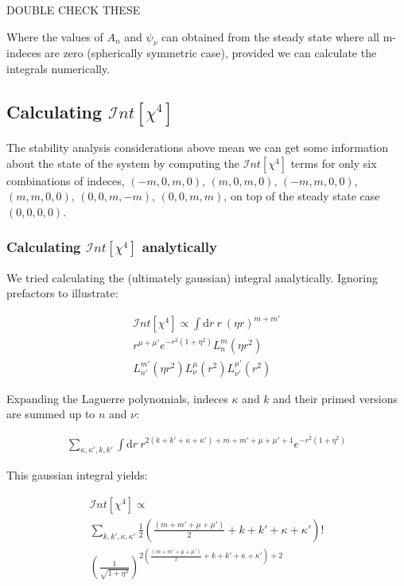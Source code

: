 \documentclass[a4paper,twocolumn,nobalancelastpage]{revtex4-1}
\newcommand{\intfour}{\mathcal{I}nt[\chi^4]}
\begin{document}
DOUBLE CHECK THESE

Where the values of $A_n$ and $\psi_\nu$ can obtained from the steady state where all m-indeces are zero (spherically symmetric case), provided we can calculate the integrals numerically.

\subsection{Calculating $\intfour$}

The stability analysis considerations above mean we can get some information about the state of the system by computing the $\intfour$ terms for only six combinations of indeces, $(-m,0,m,0)$, $(m,0,m,0)$, $(-m,m,0,0)$, $(m,m,0,0)$, $(0,0,m,-m)$, $(0,0,m,m)$, on top of the steady state case $(0,0,0,0)$. 

\subsubsection{Calculating $\intfour$ analytically}

We tried calculating the (ultimately gaussian) integral analytically. Ignoring prefactors to illustrate:

\begin{multline}
\intfour \propto \int \mathrm{d}r \ r \ \left( \eta r\right)^{m+m'} \\ r^{\mu+\mu'} e^{-r^2(1+\eta^2)}
  L^m_n\left(\eta r^2\right) \\  L^{m'}_{n'}\left(\eta r^2\right)  L^{\mu}_{\nu}\left( r^2 \right) L^{\mu'}_{\nu'}\left(r^2\right)
\end{multline}

Expanding the Laguerre polynomials, indeces $\kappa$ and $k$ and their primed versions are summed up to $n$ and $\nu$:

\begin{multline}
\sum_{\kappa, \kappa', k, k'} \int \mathrm{d}r \ r^{2(k+k'+\kappa+\kappa')+m+m'+\mu+\mu'+1} e^{-r^2(1+\eta^2)}
\end{multline}

This gaussian integral yields:

\begin{multline}
\label{eq:intfoureqn}
\intfour \propto \\ \sum_{k, k', \kappa, \kappa'} \frac{1}{2} \left(\frac{(m+m'+\mu+\mu')}{2}+k+k'+\kappa+\kappa'\right)! \\ \left(\frac{1}{\sqrt{1+\eta^2}}\right)^{2\left(\frac{(m+m'+\mu+\mu')}{2}+k+k'+\kappa+\kappa'\right)+2}
\end{multline}
\end{document}
